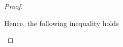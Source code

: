 \begin{proof}
\begin{itemize}
         
        Hence, the following inequality holds
        
    

\end{itemize}
\end{proof}
